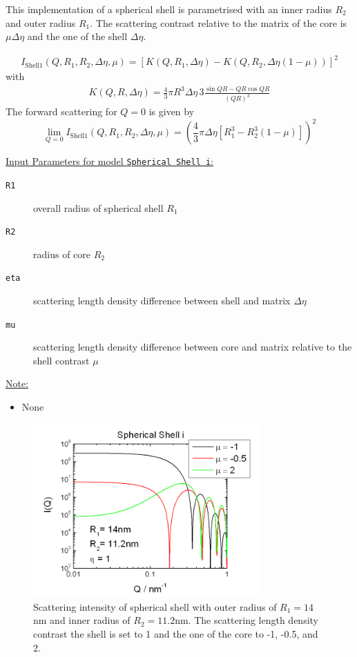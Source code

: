 This implementation of a spherical shell is parametrised with an inner radius $ R_2$ and outer
radius $R_1$. The scattering contrast relative to the matrix of the core is $\mu \Delta \eta$
and the one of the shell $\Delta\eta$.

\begin{align}
I_\text{Shell1}(Q,R_1,R_2,\Delta\eta,\mu)=
\left[K(Q,R_1,\Delta\eta)-K(Q,R_2,\Delta\eta(1-\mu))\right]^2
\end{align}
with
\begin{align}
 K(Q,R,\Delta\eta) = \frac{4}{3}\pi R^3 \Delta\eta \, 3 \frac{\sin QR - QR \cos QR}{(QR)^3}
\end{align}
The forward scattering for $Q=0$ is given by
$$
\lim_{Q=0}I_\text{Shell1}(Q,R_1,R_2,\Delta\eta,\mu) =
\left(\frac{4}{3}\pi \Delta\eta \left[ R_1^3 -
R_2^3(1-\mu)\right]\right)^2
$$

\vspace{5mm}
\noindent  \underline{Input Parameters for model \texttt{Spherical Shell i}:}
\begin{description}
\item[\texttt{R1}] overall radius of spherical shell $R_1$
\item[\texttt{R2}] radius of core $R_2$
\item[\texttt{eta}] scattering length density difference between shell and matrix $\Delta\eta$
\item[\texttt{mu}] scattering length density difference between core and matrix relative to the shell contrast $\mu$
\end{description}

\noindent\underline{Note:}
\begin{itemize}
\item[~] None
\end{itemize}

\begin{figure}[htb]
\begin{center}
\includegraphics[width=0.768\textwidth,height=0.588\textwidth]{../images/form_factor/spheres/shell_i_P.png}
\end{center}
\caption{Scattering intensity of spherical shell with outer radius of $R_1=14$nm
and inner radius of $R_2=11.2$nm. The scattering length density contrast the shell is set to 1
and the one of the core to -1, -0.5, and 2.} \label{fig:I_shell_i}
\end{figure}


